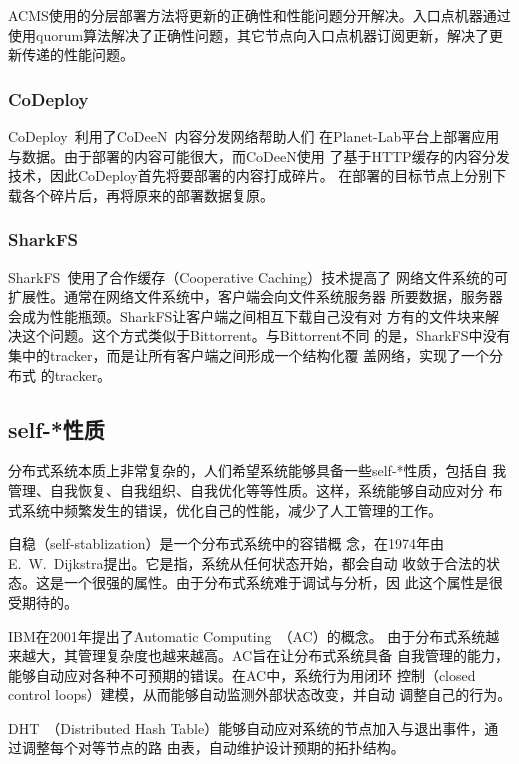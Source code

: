 ACMS使用的分层部署方法将更新的正确性和性能问题分开解决。入口点机器通过
使用quorum算法解决了正确性问题，其它节点向入口点机器订阅更新，解决了更
新传递的性能问题。

\subsubsection*{CoDeploy}

CoDeploy~\cite{codeploy}利用了CoDeeN~\cite{codeen}内容分发网络帮助人们
在Planet-Lab平台上部署应用与数据。由于部署的内容可能很大，而CoDeeN使用
了基于HTTP缓存的内容分发技术，因此CoDeploy首先将要部署的内容打成碎片。
在部署的目标节点上分别下载各个碎片后，再将原来的部署数据复原。

\subsubsection*{SharkFS}

SharkFS~\cite{sharkfs}使用了合作缓存（Cooperative Caching）技术提高了
网络文件系统的可扩展性。通常在网络文件系统中，客户端会向文件系统服务器
所要数据，服务器会成为性能瓶颈。SharkFS让客户端之间相互下载自己没有对
方有的文件块来解决这个问题。这个方式类似于Bittorrent。与Bittorrent不同
的是，SharkFS中没有集中的tracker，而是让所有客户端之间形成一个结构化覆
盖网络\cite{can, pastry, tapestry, chord, kademlia}，实现了一个分布式
的tracker。


\subsection{self-*性质}


分布式系统本质上非常复杂的，人们希望系统能够具备一些self-*性质，包括自
我管理、自我恢复、自我组织、自我优化等等性质。这样，系统能够自动应对分
布式系统中频繁发生的错误，优化自己的性能，减少了人工管理的工作。

自稳\cite{Dijkstra1974}（self-stablization）是一个分布式系统中的容错概
念，在1974年由E.\ W.\ Dijkstra提出。它是指，系统从任何状态开始，都会自动
收敛于合法的状态。这是一个很强的属性。由于分布式系统难于调试与分析，因
此这个属性是很受期待的。

IBM在2001年提出了Automatic Computing~\cite{Kephart2003}（AC）的概念。
由于分布式系统越来越大，其管理复杂度也越来越高。AC旨在让分布式系统具备
自我管理的能力，能够自动应对各种不可预期的错误。在AC中，系统行为用闭环
控制（closed control loops）建模，从而能够自动监测外部状态改变，并自动
调整自己的行为。

DHT~\cite{can, pastry, tapestry, chord, kademlia}（Distributed Hash
Table）能够自动应对系统的节点加入与退出事件，通过调整每个对等节点的路
由表，自动维护设计预期的拓扑结构。

